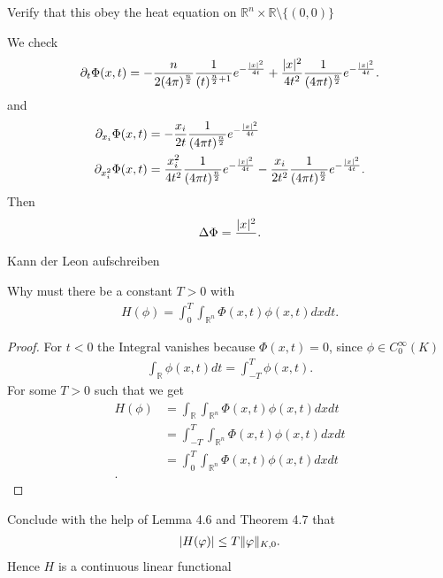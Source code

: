 \newpage
\begin{exercise}[b]
 Verify that this obey the heat equation on $\mathbb{R}^{n}  \times  \mathbb{R} \setminus \{(0,0)\}  $  
\end{exercise}
\begin{solution}
 We check 
 \begin{align*}
   \partial_t \Phi(x,t) =  -\frac{n}{2 (4\pi)^{\frac{n}{2}}}\frac{1}{  (t)^{\frac{n}{2} + 1} }e^{-\frac{\lvert x\rvert^2}{4t}} + \frac{\lvert x\rvert^2}{4t^2}\frac{1}{(4\pi t)^{\frac{n}{2}} }e^{-\frac{\lvert x\rvert^2}{4t}} 
 .\end{align*}
 and 
 \begin{align*}
   \partial_{x_i} \Phi(x,t) &=  -\frac{x_i}{2t}\frac{1}{(4\pi t)^{\frac{n}{2}}} e^{-\frac{\lvert x\rvert^2}{4t}} \\
   \partial_{x^2_i} \Phi(x,t) &=  \frac{x^2_i}{4t^2}\frac{1}{(4\pi t)^{\frac{n}{2}}} e^{-\frac{\lvert x\rvert^2}{4t}}  - \frac{x_i}{2t^2}\frac{1}{(4\pi t)^{\frac{n}{2}} }e^{-\frac{\lvert x\rvert^2}{4t}} 
 .\end{align*}
 Then 
 \begin{align*}
   \Delta \Phi   = \frac{\lvert x\rvert^2}{}
 .\end{align*}
 Kann der Leon aufschreiben
\end{solution}
\begin{exercise}[c]
 Why must there be a constant $T>0$  with 
 \begin{align*}
   H(\phi ) = \int_0^{T}  \int_{\mathbb{R}^{n} } \Phi(x,t)\phi(x,t)dx dt
 .\end{align*}
\end{exercise}
\begin{proof}
 For $t<0$  the Integral vanishes because $\Phi(x,t) = 0$, since $\phi  \in  C_0^{\infty}(K) $ 
 \begin{align*}
   \int_{\mathbb{R}} \phi(x,t) dt = \int_{-T}^{T}  \phi(x,t)
 .\end{align*}
 For some $T>0$ such that we get 
 \begin{align*}
   H(\phi ) &= \int_{\mathbb{R}}  \int_{\mathbb{R}^{n} } \Phi(x,t)\phi(x,t)dx dt\\
            &= \int_{-T}^{T}   \int_{\mathbb{R}^{n} } \Phi(x,t)\phi(x,t)dx dt\\
            &= \int_{0}^{T}   \int_{\mathbb{R}^{n} } \Phi(x,t)\phi(x,t)dx dt\\
 .\end{align*}
\end{proof}
\begin{exercise}[d]
 Conclude with the help of Lemma 4.6 and Theorem 4.7 that 
 \begin{align*}
   \lvert H(\varphi )\rvert\le T \|\varphi \|_{K,0}
 .\end{align*}
 Hence $H$ is a continuous linear functional
\end{exercise}
